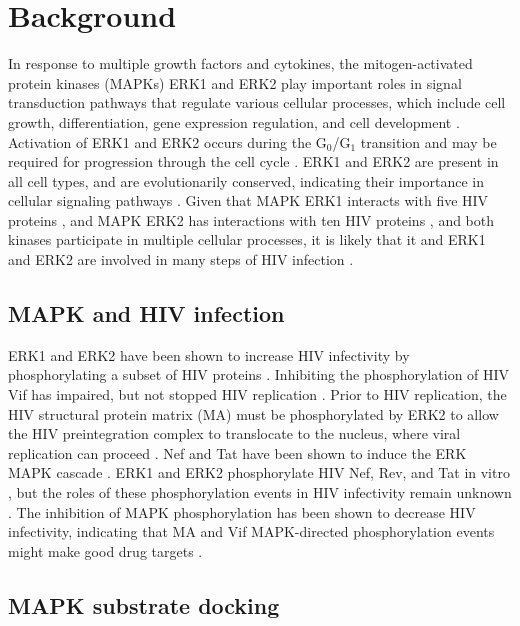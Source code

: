 \section{Background}

In response to multiple growth factors and cytokines, the
mitogen-activated protein kinases (MAPKs) ERK1 and ERK2 play important
roles in signal transduction pathways that regulate various cellular
processes, which include cell growth, differentiation, gene expression
regulation, and cell development
\cite{kolch2005coordinating,blenis1993signal}. Activation of ERK1 and
ERK2 occurs during the G$_0$/G$_1$ transition and may be required for
progression through the cell cycle
\cite{lavoie1996cyclin,roovers2000integrating}. ERK1 and ERK2 are
present in all cell types, and are evolutionarily conserved,
indicating their importance in cellular signaling pathways
\cite{sugden1997regulation,marshall1994map,robbins1994map}. Given that
MAPK ERK1 interacts with five HIV proteins \cite{fu09}, and MAPK ERK2
has interactions with ten HIV proteins \cite{kolch2005coordinating},
and both kinases participate in multiple cellular processes, it is
likely that it and ERK1 and ERK2 are involved in many steps of HIV
infection \cite{ptak08}.

\subsection{MAPK and HIV infection}

ERK1 and ERK2 have been shown to increase HIV infectivity by
phosphorylating a subset of HIV proteins \cite{yang99}. Inhibiting the
phosphorylation of HIV Vif has impaired, but not stopped HIV
replication \cite{yang99, barraud08}. Prior to HIV replication, the
HIV structural protein matrix (MA) must be phosphorylated by ERK2 to
allow the HIV preintegration complex to translocate to the nucleus,
where viral replication can proceed \cite{bukrinskaya96}. Nef and Tat
have been shown to induce the ERK MAPK cascade
\cite{toschi06,schrager02}. ERK1 and ERK2 phosphorylate HIV Nef, Rev,
and Tat in vitro \cite{yang99}, but the roles of these phosphorylation
events in HIV infectivity remain unknown \cite{yang98}. The inhibition
of MAPK phosphorylation has been shown to decrease HIV infectivity,
indicating that MA and Vif MAPK-directed phosphorylation events might
make good drug targets \cite{yang99,bukrinskaya96}.

\subsection{MAPK substrate docking} 

